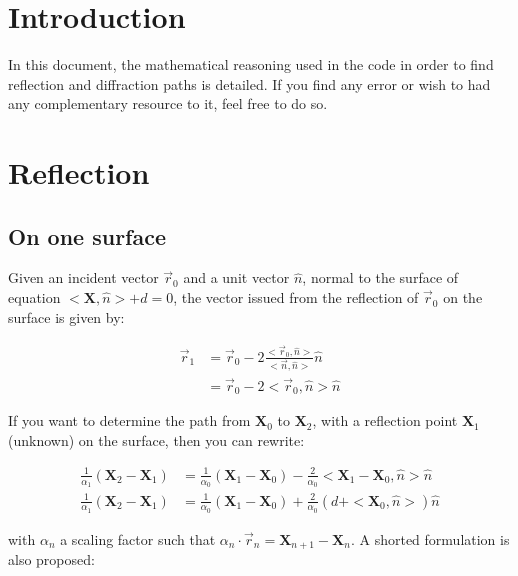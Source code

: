 \documentclass[french,10pt]{article}
\begin{document}
\setcounter{page}{0}


\newpage

\section{Introduction}

    In this document, the mathematical reasoning used in the code in order to find reflection and diffraction paths is detailed. If you find any error or wish to had any complementary resource to it, feel free to do so.
    
\section{Reflection}

    \subsection{On one surface}

    Given an incident vector $\vec{r}_0$ and a unit vector $\hat{n}$, normal to the surface of equation $<\pmb{X},\hat{n}> + d = 0$, the vector issued from the reflection of $\vec{r}_0$ on the surface is given by:
    
    \begin{align}
        \vec{r}_1 &= \vec{r}_0 - 2 \frac{<\vec{r}_0,\hat{n}>}{<\vec{n},\hat{n}>} \hat{n}\\
        &= \vec{r}_0 - 2 <\vec{r}_0,\hat{n}> \hat{n}
    \end{align}
    
    If you want to determine the path from $\pmb{X}_0$ to $\pmb{X}_2$, with a reflection point $\pmb{X}_1$ (unknown) on the surface, then you can rewrite:
    
    \begin{align}
        \frac{1}{\alpha_1}\left(\pmb{X}_2 - \pmb{X}_1 \right) &= \frac{1}{\alpha_0}\left(\pmb{X}_1 - \pmb{X}_0 \right) - \frac{2}{\alpha_0}<\pmb{X}_1 - \pmb{X}_0, \hat{n} > \hat{n}\\
        \frac{1}{\alpha_1}\left(\pmb{X}_2 - \pmb{X}_1 \right) &= \frac{1}{\alpha_0}\left(\pmb{X}_1 - \pmb{X}_0 \right) + \frac{2}{\alpha_0}\left(d + <\pmb{X}_0, \hat{n} > \right)\hat{n}
    \end{align}
    
    with $\alpha_n$ a scaling factor such that $\alpha_n \cdot \vec{r}_{n} = \pmb{X}_{n+1} - \pmb{X}_n$. A shorted formulation is also proposed:\\
    
\end{document}
